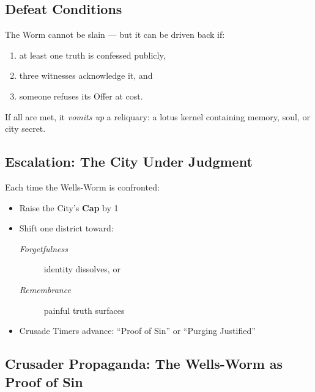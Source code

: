 \documentclass[11pt]{article}
\begin{document}
\begin{creature}
    \vspace{6pt}
    
    \subsection*{Defeat Conditions}
    The Worm cannot be slain --- but it can be driven back if:
    
    \begin{enumerate}
      \item at least one truth is confessed publicly,
      \item three witnesses acknowledge it, and
      \item someone refuses its Offer at cost.
    \end{enumerate}
    
    If all are met, it \emph{vomits up} a reliquary:  
    a lotus kernel containing memory, soul, or city secret.
    
    \vspace{6pt}
    
    \subsection*{Escalation: The City Under Judgment}
    Each time the Wells-Worm is confronted:
    
    \begin{itemize}
      \item Raise the City's \textbf{Cap} by 1
      \item Shift one district toward:
        \begin{description}
          \item[\emph{Forgetfulness}] identity dissolves, or
          \item[\emph{Remembrance}] painful truth surfaces
        \end{description}
      \item Crusade Timers advance: ``Proof of Sin'' or ``Purging Justified''
    \end{itemize}
    
    \end{creature}

\subsection*{Crusader Propaganda: The Wells-Worm as Proof of Sin}
\end{document}
